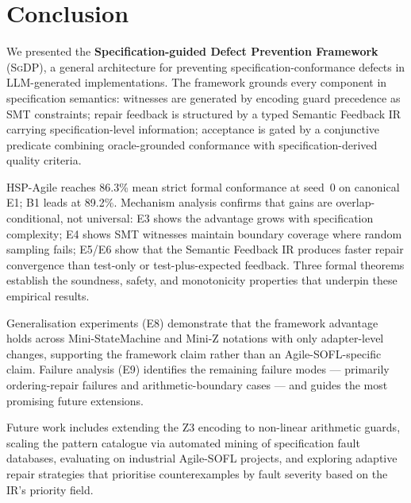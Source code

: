 \section{Conclusion}
\label{sec:conclusion}

We presented the \textbf{Specification-guided Defect Prevention Framework}
(\textsc{SgDP}), a general architecture for preventing specification-conformance defects
in LLM-generated implementations.  The framework grounds every component in specification
semantics: witnesses are generated by encoding guard precedence as SMT constraints;
repair feedback is structured by a typed Semantic Feedback IR carrying specification-level
information; acceptance is gated by a conjunctive predicate combining oracle-grounded
conformance with specification-derived quality criteria.

HSP-Agile reaches 86.3\% mean strict formal conformance at seed~0 on canonical
E1; B1 leads at 89.2\%.
Mechanism analysis confirms that gains are overlap-conditional, not universal:
E3 shows the advantage grows with specification complexity; E4 shows SMT witnesses
maintain boundary coverage where random sampling fails; E5/E6 show that the Semantic
Feedback IR produces faster repair convergence than test-only or test-plus-expected
feedback.  Three formal theorems establish the soundness, safety, and monotonicity
properties that underpin these empirical results.

Generalisation experiments (E8) demonstrate that the framework advantage holds across
Mini-StateMachine and Mini-Z notations with only adapter-level changes, supporting the
framework claim rather than an Agile-SOFL-specific claim.  Failure analysis (E9)
identifies the remaining failure modes — primarily ordering-repair failures and
arithmetic-boundary cases — and guides the most promising future extensions.

Future work includes extending the Z3 encoding to non-linear arithmetic guards,
scaling the pattern catalogue via automated mining of specification fault databases,
evaluating on industrial Agile-SOFL projects, and exploring adaptive repair strategies
that prioritise counterexamples by fault severity based on the IR's priority field.

